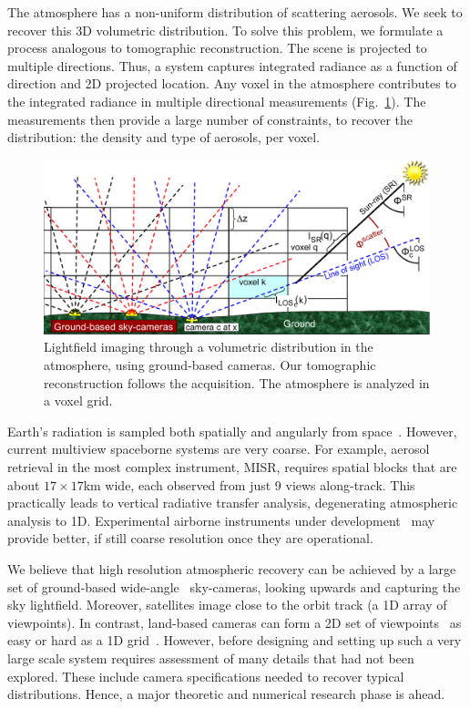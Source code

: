 \documentclass[10pt,letterpaper]{article}
\begin{document}
The atmosphere has a non-uniform distribution of scattering
aerosols. We seek to recover this 3D volumetric distribution. To solve
this problem, we formulate a process analogous to tomographic
reconstruction. The scene is projected to multiple directions. Thus, a
system captures integrated radiance as a function of direction and 2D
projected location. Any voxel in the atmosphere contributes to the
integrated radiance in multiple directional measurements
(Fig.~\ref{fig:groundgrid}). The measurements then provide a large
number of constraints, to recover the distribution: the density and
type of aerosols, per voxel.
\begin{figure}[t!]
  \begin{center}
    \includegraphics[width=\linewidth]{images/groundtomog24.pdf}
  \end{center}
  \caption{\small Lightfield imaging through a volumetric distribution
    in the atmosphere, using ground-based cameras. Our tomographic
    reconstruction follows the acquisition. The atmosphere is analyzed
    in a voxel grid.}
  \label{fig:groundgrid}
\end{figure}
Earth's radiation is sampled both spatially and angularly from
space~\cite{breon,diner,Martonchikc,vanMol}. However, current
multiview spaceborne systems are very coarse. For example, aerosol
retrieval in the most complex instrument, MISR, requires spatial
blocks that are about $17\times 17$km wide, each observed from just 9
views along-track. This practically leads to vertical radiative
transfer analysis, degenerating atmospheric analysis to
1D. Experimental airborne instruments under
development~\cite{baxter,dinerDavis10} may provide better, if still
coarse resolution once they are operational.

We believe that high resolution atmospheric recovery can be achieved
by a large set of ground-based wide-angle~\cite{Cossairt2011,
  Peleg01omnistereo:panoramic, Koppal:2011:WMS:2191740.2192152}
sky-cameras, looking upwards and capturing the sky lightfield.
Moreover, satellites image close to the orbit track (a 1D array of
viewpoints). In contrast, land-based cameras can form a 2D set of
viewpoints~\cite{DBLP:journals/pieee/SnavelySGSS10} as easy or hard as
a 1D grid~\cite{Joshi06naturalvideo}. However, before designing and
setting up such a very large scale system requires assessment of many
details that had not been explored. These include camera
specifications needed to recover typical distributions. Hence, a major
theoretic and numerical research phase is ahead.
\end{document}
